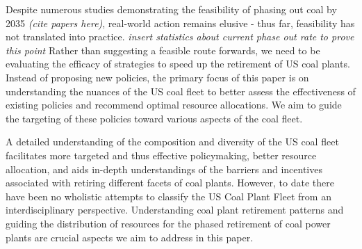Despite numerous studies demonstrating the feasibility of phasing out coal by 2035 \textit{(cite papers here)}, 
real-world action remains elusive - thus far, feasibility has not translated into practice. \textit{insert statistics about current phase out rate to prove this point} 
Rather than suggesting a feasible route forwards, we need to be evaluating the efficacy of strategies to speed up the retirement of US coal plants. 
Instead of proposing new policies, the primary focus of this paper is on understanding the nuances of the US coal fleet to better assess the effectiveness 
of existing policies and recommend optimal resource allocations. We aim to guide the targeting of these policies toward various aspects of the coal fleet.

A detailed understanding of the composition and
diversity of the US coal fleet facilitates more targeted and thus effective policymaking, better resource allocation, and aids in-depth
understandings of the barriers and incentives associated with retiring different facets of coal plants. However, to date there have been no wholistic attempts to
classify the US Coal Plant Fleet from an interdisciplinary perspective. Understanding coal plant retirement patterns 
and guiding the distribution of resources for the phased retirement of coal power plants are crucial aspects we aim to address in this paper.



